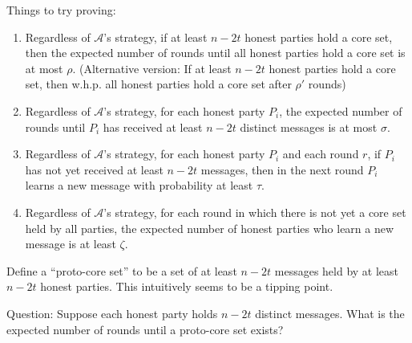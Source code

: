 \documentclass{article}
\newcommand{\A}{\mathcal{A}}
\begin{document}
Things to try proving:
\begin{enumerate}
    \item  Regardless of $\A$'s strategy, if at least $n-2t$ honest parties hold a core set, then the expected number of rounds until all honest parties hold a core set is at most $\rho$. (Alternative version:
    If at least $n-2t$ honest parties hold a core set, then w.h.p. all honest parties hold a core set after $\rho'$ rounds)
    \item Regardless of $\A$'s strategy, for each honest party $P_i$, the expected number of rounds until $P_i$ has received at least $n-2t$ distinct messages is at most $\sigma$.
    \item Regardless of $\A$'s strategy, for each honest party $P_i$ and each round $r$, if $P_i$ has not yet received at least $n-2t$ messages, then in the next round $P_i$ learns a new message with probability at least $\tau$.
    \item Regardless of $\A$'s strategy, for each round in which there is not yet a core set held by all parties, the expected number of honest parties who learn a new message is at least $\zeta$.
\end{enumerate}

Define a ``proto-core set'' to be a set of at least $n-2t$ messages held by at least $n-2t$ honest parties. This intuitively seems to be a tipping point.
    
Question: Suppose each honest party holds $n-2t$ distinct messages. What is the expected number of rounds until a proto-core set exists?
\end{document}
